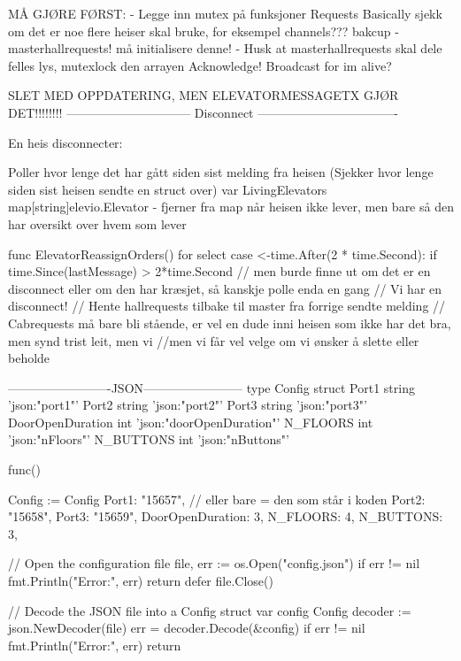 MÅ GJØRE FØRST:
- Legge inn mutex på funksjoner
    Requests
    Basically sjekk om det er noe flere heiser skal bruke, for eksempel channels??? bakcup - masterhallrequests! må initialisere denne!
- Husk at masterhallrequests skal dele felles lys, mutexlock den arrayen
Acknowledge!
Broadcast for im alive?

SLET MED OPPDATERING, MEN ELEVATORMESSAGETX GJØR DET!!!!!!!!
------------------------------ Disconnect ----------------------------------

En heis disconnecter:

Poller hvor lenge det har gått siden sist melding fra heisen (Sjekker hvor lenge siden sist heisen sendte en struct over)
var LivingElevators map[string]elevio.Elevator - fjerner fra map når heisen ikke lever, men bare så den har oversikt over hvem som lever

func ElevatorReassignOrders() {
    for {
        select {
        case <-time.After(2 * time.Second):
            if time.Since(lastMessage) > 2*time.Second { // men burde finne ut om det er en disconnect eller om den har kræsjet, så kanskje polle enda en gang
                // Vi har en disconnect!
                // Hente hallrequests tilbake til master fra forrige sendte melding
                // Cabrequests må bare bli stående, er vel en dude inni heisen som ikke har det bra, men synd trist leit, men vi 
                        //men vi får vel velge om vi ønsker å slette eller beholde
            }
        }
    }
}

-------------------------JSON------------------------
type Config struct {
    Port1 string            'json:"port1"'
    Port2 string            'json:"port2"'
    Port3 string            'json:"port3"'
    DoorOpenDuration int   'json:"doorOpenDuration"'
    N_FLOORS int            'json:"nFloors"'
    N_BUTTONS int          'json:"nButtons"'
} 


func(){

Config := Config{
    Port1: "15657", // eller bare = den som står i koden
    Port2: "15658",
    Port3: "15659",
    DoorOpenDuration: 3,
    N_FLOORS: 4,
    N_BUTTONS: 3,
}

    // Open the configuration file
    file, err := os.Open("config.json")
    if err != nil {
        fmt.Println("Error:", err)
        return
    }
    defer file.Close()

    // Decode the JSON file into a Config struct
    var config Config
    decoder := json.NewDecoder(file)
    err = decoder.Decode(&config)
    if err != nil {
        fmt.Println("Error:", err)
        return
    }
}

